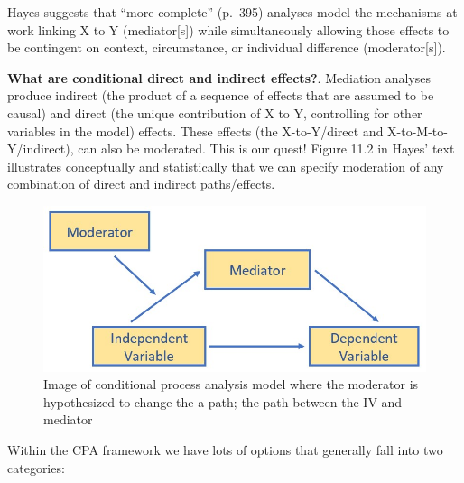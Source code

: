 \documentclass[
  english,
]{book}
\begin{document}
Hayes \citeyearpar{hayes_introduction_2018} suggests that ``more complete'' (p.~395) analyses model the mechanisms at work linking X to Y (mediator{[}s{]}) while simultaneously allowing those effects to be contingent on context, circumstance, or individual difference (moderator{[}s{]}).

\textbf{What are conditional direct and indirect effects?}. Mediation analyses produce indirect (the product of a sequence of effects that are assumed to be causal) and direct (the unique contribution of X to Y, controlling for other variables in the model) effects. These effects (the X-to-Y/direct and X-to-M-to-Y/indirect), can also be moderated. This is our quest! Figure 11.2 in Hayes' text \citeyearpar{hayes_introduction_2018} illustrates conceptually and statistically that we can specify moderation of any combination of direct and indirect paths/effects.

\begin{figure}
\centering
\includegraphics{images/SimpleMed/CPAmodel.jpg}
\caption{Image of conditional process analysis model where the moderator is hypothesized to change the a path; the path between the IV and mediator}
\end{figure}

Within the CPA framework we have lots of options that generally fall into two categories:
\end{document}
